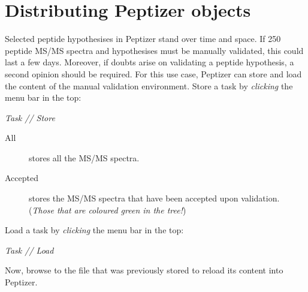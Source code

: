 \section{Distributing Peptizer objects}
\npar Selected peptide hypothesises in Peptizer stand over time and space. If 250 peptide MS/MS spectra and hypothesises must be manually validated, this could last a few days. Moreover, if doubts arise on validating a peptide hypothesis, a second opinion should be required. For this use case, Peptizer can store and load the content of the manual validation environment.
\npar Store a task by \textit{clicking }the menu bar in the top:
%
\begin{center}
\textit{Task // Store}	
\end{center}
%
%
\begin{description}
	\item[All] stores all the MS/MS spectra.
	\item[Accepted] stores the MS/MS spectra that have been accepted upon validation. (\textit{Those that are coloured green in the tree!})
\end{description}
%
\npar Load a task by \textit{clicking }the menu bar in the top:
%
\begin{center}
\textit{Task // Load}	
\end{center}
%
\npar Now, browse to the file that was previously stored to reload its content into Peptizer.
%
\begin{center}
\end{center}
%
